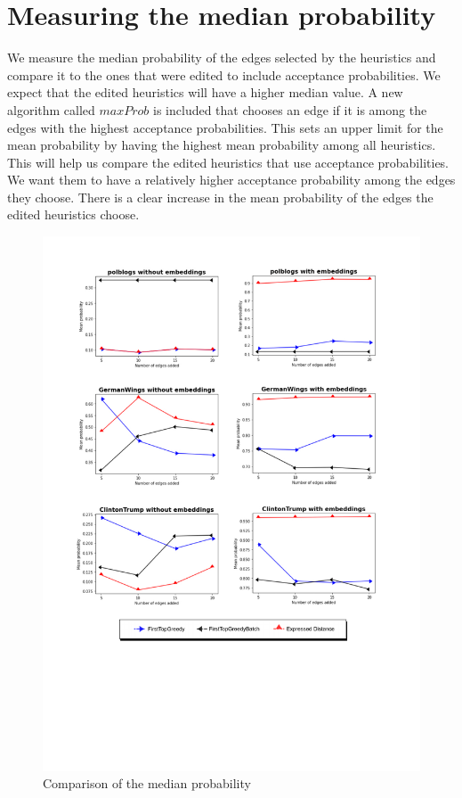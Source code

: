 \clearpage


\section{Measuring the median probability}		
\label{sec:median}

We measure the median probability of the edges selected by the heuristics and compare it to the ones that were edited to include acceptance probabilities. We expect that the edited heuristics will have a higher median value. A new algorithm called $maxProb$ is included that chooses an edge if it is among the edges with the highest acceptance probabilities. This sets an upper limit for the mean probability by having the highest mean probability among all heuristics. This will help us compare the edited heuristics that use acceptance probabilities. We want them to have a relatively higher acceptance probability among the edges they choose. There is a clear increase in the mean probability of the edges the edited heuristics choose.

\begin{figure}[!htbp]
	\begin{center}
	\advance\leftskip-1.5cm
	\captionsetup{justification=centering,margin=2cm}
	\includegraphics[width=1.2\textwidth]{Figures/m2}
	\caption{Comparison of the median probability}
	\label{m1}
	\end{center}
\end{figure}

